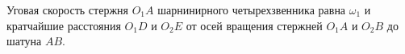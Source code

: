Уговая скорость стержня $O_{1}A$ шарнинирного четырехзвенника равна $\omega_{1}$
и кратчайшие расстояния $O_{1}D$ и $O_{2}E$ от осей вращения стержней 
$O_{1}A$ и $O_{2}B$ до шатуна $AB$.
